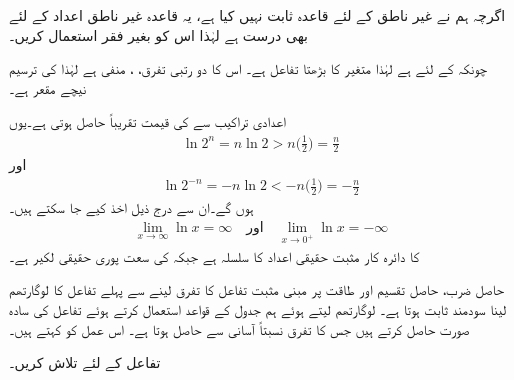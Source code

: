 اگرچہ ہم نے غیر ناطق  کے لئے قاعدہ  ثابت نہیں کیا ہے، یہ قاعدہ غیر ناطق اعداد کے لئے بھی درست ہے لہٰذا اس کو بغیر فقر استعمال کریں۔ 

چونکہ  کے لئے   ہے لہٰذا  متغیر  کا بڑھتا تفاعل ہے۔ اس کا دو رتبی تفرق، ، منفی ہے لہٰذا  کی ترسیم نیچے مقعر ہے۔

اعدادی تراکیب سے   کی قیمت تقریباً  حاصل ہوتی ہے۔یوں
\begin{align*}
\ln 2^n=n\ln 2>n\big(\frac{1}{2}\big)=\frac{n}{2}
\end{align*}
اور
\begin{align*}
\ln 2^{-n}=-n\ln 2<-n\big(\frac{1}{2}\big)=-\frac{n}{2}
\end{align*}
ہوں گے۔ان سے درج ذیل اخذ کیے جا سکتے ہیں۔
\begin{align*}
\lim_{x\to \infty}\ln x=\infty\quad \text{اور}\quad \lim_{x\to 0^+}\ln x=-\infty
\end{align*}
 کا دائرہ کار مثبت حقیقی اعداد کا سلسلہ ہے جبکہ  کی سعت پوری حقیقی لکیر ہے۔

حاصل ضرب، حاصل تقسیم اور طاقت  پر مبنی مثبت تفاعل کا تفرق لینے سے پہلے  تفاعل کا لوگارتھم لینا سودمند ثابت ہوتا ہے۔ لوگارتھم لیتے ہوئے ہم جدول  کے قواعد استعمال کرتے ہوئے تفاعل کی سادہ صورت حاصل کرتے ہیں جس کا تفرق نسبتاً آسانی سے حاصل ہوتا ہے۔ اس عمل کو  کہتے ہیں۔ 

تفاعل  کے لئے  تلاش کریں۔

